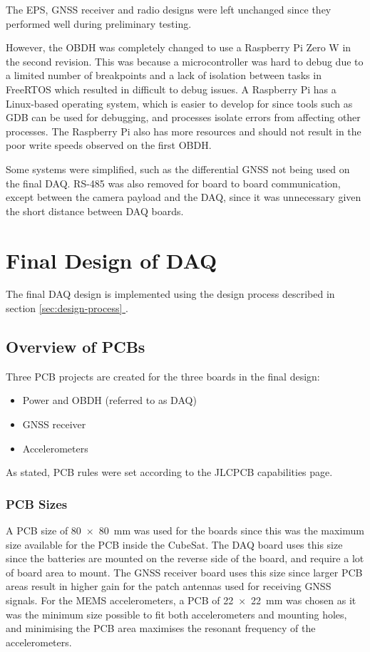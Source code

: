 \documentclass{report}
\newcommand*{\secref}[1]{section \hyperref[{#1}]{\ref*{#1} \nameref*{#1}}}
\begin{document}
The EPS, GNSS receiver and radio designs were left unchanged since they performed well during preliminary testing.

However, the OBDH was completely changed to use a Raspberry Pi Zero W in the second revision. This was because a microcontroller was hard to debug due to a limited number of breakpoints and a lack of isolation between tasks in FreeRTOS which resulted in difficult to debug issues. A Raspberry Pi has a Linux-based operating system, which is easier to develop for since tools such as GDB can be used for debugging, and processes isolate errors from affecting other processes. The Raspberry Pi also has more resources and should not result in the poor write speeds observed on the first OBDH.

Some systems were simplified, such as the differential GNSS not being used on the final DAQ. RS-485 was also removed for board to board communication, except between the camera payload and the DAQ, since it was unnecessary given the short distance between DAQ boards.

\chapter{Final Design of DAQ}

The final DAQ design is implemented using the design process described in \secref{sec:design-process}.

\section{Overview of PCBs}

Three PCB projects are created for the three boards in the final design:
\begin{itemize}
  \item Power and OBDH (referred to as DAQ)
  \item GNSS receiver
  \item Accelerometers
\end{itemize}

As stated, PCB rules were set according to the JLCPCB capabilities page.

\subsection{PCB Sizes}
A PCB size of \SI{80 x 80}{\milli\metre} was used for the  boards since this was the maximum size available for the PCB inside the CubeSat. The DAQ board uses this size since the batteries are mounted on the reverse side of the board, and require a lot of board area to mount. The GNSS receiver board uses this size since larger PCB areas result in higher gain for the patch antennas used for receiving GNSS signals. For the MEMS accelerometers, a PCB of \SI{22 x 22}{\milli\metre} was chosen as it was the minimum size possible to fit both accelerometers and mounting holes, and minimising the PCB area maximises the resonant frequency of the accelerometers.
\end{document}
